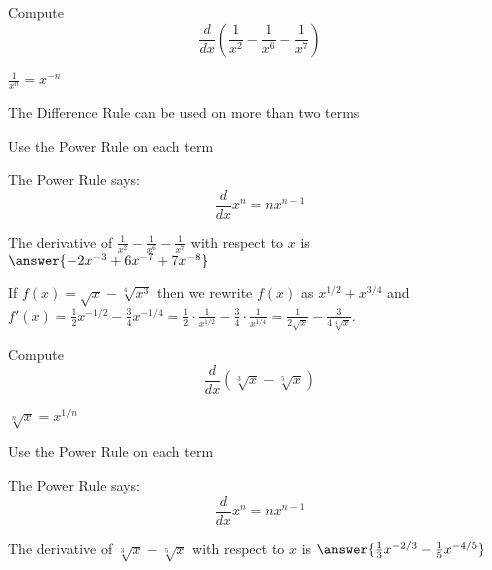 \documentclass[handout]{ximera}
\begin{document}
\begin{problem} %
  Compute 
  \[
  \frac{d}{dx} \left(\frac{1}{x^2} - \frac{1}{x^6} - \frac{1}{x^7}\right)
  \]
  
    \begin{hint}
		 $\frac{1}{x^n} = x^{-n}$
		\end{hint}
		\begin{hint}
		  The Difference Rule can be used on more than two terms
		\end{hint}
		\begin{hint}
      Use the Power Rule on each term
    \end{hint}
    \begin{hint}
      The Power Rule says:
      \[
      \frac{d}{dx} x^n = nx^{n-1}
      \]
    \end{hint}    
		The derivative of $\frac{1}{x^2} - \frac{1}{x^6} - \frac{1}{x^7}$ with respect to $x$ is
		 $\answer{-2x^{-3} + 6x^{-7} + 7x^{-8}}$
	
\end{problem}


\begin{example} %
 If $f(x) = \sqrt x - \sqrt[4] {x^3}$ then we rewrite $f(x)$ as $x^{1/2} + x^{3/4}$ and
$f'(x) = \tfrac12 x^{-1/2} - \tfrac34 x^{-1/4} = \tfrac12 \cdot \frac{1}{x^{1/2}} - \tfrac34 \cdot \frac{1}{x^{1/4}} 
= \frac{1}{2\sqrt x} - \frac{3}{4\sqrt[4] x}$.
\end{example}


\begin{problem} %
  Compute 
  \[
  \frac{d}{dx} \left(\sqrt[3] x - \sqrt[5] x\right)
  \]
  
    \begin{hint}
		 $\sqrt[n] x = x^{1/n}$
		\end{hint}
		\begin{hint}
      Use the Power Rule on each term
    \end{hint}
    \begin{hint}
      The Power Rule says:
      \[
      \frac{d}{dx} x^n = nx^{n-1}
      \]
    \end{hint}    
		The derivative of $\sqrt[3] x - \sqrt[5] x$ with respect to $x$ is
		 $\answer{\frac13 x^{-2/3} - \frac15 x^{-4/5}}$
	
\end{problem}
\end{document}
